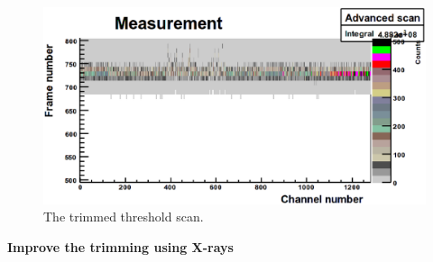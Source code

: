 \begin{figure}
\begin{center}
\includegraphics[width=\textwidth]{images/noise_thresholdscantrimmed}
\end{center}
\caption{The trimmed threshold scan.}\label{fig:thresholdscantrimmed}
\end{figure}



\textbf{Improve the trimming using X-rays}\label{sec:improvetrimming}\\

